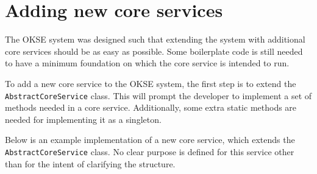 \section{Adding new core services}
\label{sec:adding-new-core-services}

The OKSE system was designed such that extending the system with additional core services should be as easy as possible. Some boilerplate code is still needed to have a minimum foundation on which the core service is intended to run.

To add a new core service to the OKSE system, the first step is to extend the \\\verb!AbstractCoreService! class. This will prompt the developer to implement a set of methods needed in a core service. Additionally, some extra static methods are needed for implementing it as a singleton.

Below is an example implementation of a new core service, which extends the \\\verb!AbstractCoreService! class. No clear purpose is defined for this service other than for the intent of clarifying the structure.

